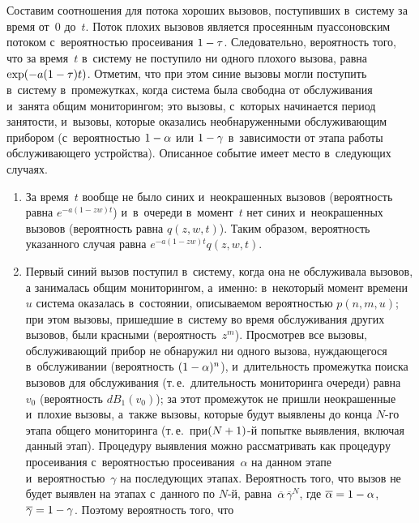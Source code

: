 \begin{multicols}{2}
  Составим соотношения для потока хороших вызовов, поступивших в~систему 
за время от~0 до~$t$. Поток плохих вызовов является просеянным 
пуассоновским потоком с~вероятностью просеивания $1\hm-\tau$. 
Следовательно, вероятность того, что за время~$t$ в~систему не поступило ни 
одного плохого вызова, равна $\exp (-a(1\hm- \tau)t)$. Отметим, что при этом 
синие вызовы могли поступить в~систему в~промежутках, когда система была 
свободна от обслуживания и~занята общим мониторингом; это вызовы, 
с~которых начинается период занятости, и~вызовы, которые оказались 
необнаруженными обслуживающим прибором (с~вероятностью $1\hm-\alpha$ 
или $1\hm-\gamma$ в~зависимости от этапа работы обслуживающего 
устройства). Описанное событие имеет место в~следующих случаях.\\[-14pt]
  \begin{enumerate}
  \item За время~$t$ вообще не было синих и~неокрашенных вызовов 
(вероятность равна $e^{-a(1-zw)t}$) и~в~очереди в~момент~$t$ нет синих 
и~неокрашенных вызовов (вероятность равна $q(z,w,t)$). Таким образом, 
вероятность указанного случая равна $e^{-a(1-zw)t} q(z,w,t)$.\\[-14pt]
  \item  Первый синий вызов поступил в~систему, когда она не обслуживала 
вызовов, а занималась общим мониторингом, а~именно: в~некоторый момент 
времени~$u$ система оказалась в~состоянии, описываемом вероятностью 
$p(n,m,u)$; при этом вызовы, пришедшие в~систему во время обслуживания 
других вызовов, были красными (вероятность~$z^m$). Просмотрев все вызовы, 
обслуживающий прибор не обнаружил ни одного вызова, нуждающегося 
в~обслуживании (вероятность $(1\hm-\alpha)^n$), и~длительность промежутка 
поиска вызовов для обслуживания (т.\,е.\ длительность мониторинга очереди) 
равна~$v_0$ (вероятность $dB_1(v_0)$); за этот промежуток не пришли 
неокрашенные и~плохие вызовы, а~также вызовы, которые будут выявлены до 
конца $N$-го этапа общего мониторинга (т.\,е.\ при\linebreak $(N\hm+1)$-й попытке 
выявления, включая\linebreak
 данный этап). Процедуру выявления можно рас\-смат\-ри\-вать 
как процедуру просеивания с~ве\-ро\-ят\-ностью просеивания~$\alpha$ на данном 
этапе и~вероятностью~$\gamma$ на последующих этапах. \mbox{Вероятность} того, 
что вызов не будет выявлен на этапах с~данного по $N$-й, 
равна~$\overline{\alpha}\,\overline{\gamma}^N$, где $\overline{\alpha}\hm=1\hm-
\alpha$, $\overline{\gamma}\hm= 1\hm-\gamma$. Поэтому вероятность того, что 

\end{enumerate}
\end{multicols}
